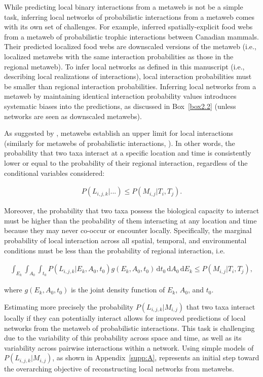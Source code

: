 While predicting local binary interactions from a metaweb is not be a simple
task, inferring local networks of probabilistic interactions from a metaweb
comes with its own set of challenges. For example, \textcite{Dansereau2024Spatially}
inferred spatially-explicit food webs from a metaweb of probabilistic trophic
interactions between Canadian mammals. Their predicted localized food webs are
downscaled versions of the metaweb (i.e., localized metawebs with the same
interaction probabilities as those in the regional metaweb). To infer local
networks as defined in this manuscript (i.e., describing local realizations of
interactions), local interaction probabilities must be smaller than regional
interaction probabilities. Inferring local networks from a metaweb by
maintaining identical interaction probability values introduces systematic
biases into the predictions, as discussed in Box~\ref{box2.2} (unless networks are seen as
downscaled metawebs).

As suggested by \textcite{McLeod2021Sampling}, metawebs establish an upper limit for
local interactions (similarly for metawebs of probabilistic interactions,
\cite{Strydom2023Grapha}). In other words, the probability that two taxa interact
at a specific location and time is consistently lower or equal to the
probability of their regional interaction, regardless of the conditional
variables considered:

\begin{eqnarray}
  \label{eq:switch}
  P(L_{i, j, k} | ...) \le P(M_{i, j} | T_i, T_j).
\end{eqnarray}

Moreover, the probability that two taxa possess the biological capacity to
interact must be higher than the probability of them interacting at any location
and time because they may never co-occur or encounter locally. Specifically, the
marginal probability of local interaction across all spatial, temporal, and
environmental conditions must be less than the probability of regional
interaction, i.e.

\begin{eqnarray}
  \label{eq:all}
  \int_{E_k}\int_{A_0}\int_{t_0} P(L_{i, j, k} | E_k, A_0, t_0) g(E_k, A_0,
t_0)\, \text{d}t_0 \, \text{d}A_0 \,\text{d}E_k \leq P(M_{i, j} | T_i, T_j),
\end{eqnarray}

where $g(E_k, A_0, t_0)$ is the joint density function of $E_k$, $A_0$, and $t_0$.

Estimating more precisely the probability $P(L_{i, j, k}|M_{i, j})$ that two
taxa interact locally if they can potentially interact allows for improved
predictions of local networks from the metaweb of probabilistic interactions.
This task is challenging due to the variability of this probability across space
and time, as well as its variability across pairwise interactions within a
network. Using simple models of $P(L_{i, j, k}|M_{i, j})$, as shown in
Appendix~\ref{supp:A}, represents an initial step toward the overarching
objective of reconstructing local networks from metawebs.


